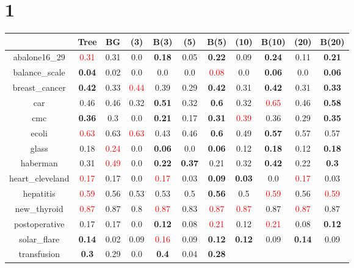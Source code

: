 \documentclass{article}%
\begin{document}
\section*{1}%
\begin{tabular}{c|cccccccccc}%
\hline%
&Tree&BG&(3)&B(3)&(5)&B(5)&(10)&B(10)&(20)&B(20)\\%
\hline%
abalone16\_29&\textcolor{red}{ 
0.31
}&0.31&0.0&\textbf{0.18}&0.05&\textbf{0.22}&0.09&\textbf{0.24}&0.11&\textbf{0.21}\\%
\hline%
balance\_scale&\textbf{0.04}&0.02&0.0&0.0&0.0&\textcolor{red}{ 
0.08
}&0.0&\textbf{0.06}&0.0&\textbf{0.06}\\%
\hline%
breast\_cancer&\textbf{0.42}&0.33&\textcolor{red}{ 
0.44
}&0.39&0.29&\textbf{0.42}&0.31&\textbf{0.42}&0.31&\textbf{0.33}\\%
\hline%
car&0.46&0.46&0.32&\textbf{0.51}&0.32&\textbf{0.6}&0.32&\textcolor{red}{ 
0.65
}&0.46&\textbf{0.58}\\%
\hline%
cmc&\textbf{0.36}&0.3&0.0&\textbf{0.21}&0.17&\textbf{0.31}&\textcolor{red}{ 
0.39
}&0.36&0.29&\textbf{0.35}\\%
\hline%
ecoli&\textcolor{red}{ 
0.63
}&0.63&\textcolor{red}{ 
0.63
}&0.43&0.46&\textbf{0.6}&0.49&\textbf{0.57}&0.57&0.57\\%
\hline%
glass&0.18&\textcolor{red}{ 
0.24
}&0.0&\textbf{0.06}&0.0&\textbf{0.06}&0.12&\textbf{0.18}&0.12&\textbf{0.18}\\%
\hline%
haberman&0.31&\textcolor{red}{ 
0.49
}&0.0&\textbf{0.22}&\textbf{0.37}&0.21&0.32&\textbf{0.42}&0.22&\textbf{0.3}\\%
\hline%
heart\_cleveland&\textcolor{red}{ 
0.17
}&0.17&0.0&\textcolor{red}{ 
0.17
}&0.03&\textbf{0.09}&\textbf{0.03}&0.0&\textcolor{red}{ 
0.17
}&0.03\\%
\hline%
hepatitis&\textcolor{red}{ 
0.59
}&0.56&0.53&0.53&0.5&\textbf{0.56}&0.5&\textcolor{red}{ 
0.59
}&0.56&\textcolor{red}{ 
0.59
}\\%
\hline%
new\_thyroid&\textcolor{red}{ 
0.87
}&0.87&0.8&\textcolor{red}{ 
0.87
}&0.83&\textcolor{red}{ 
0.87
}&\textcolor{red}{ 
0.87
}&0.87&\textcolor{red}{ 
0.87
}&0.87\\%
\hline%
postoperative&0.17&0.17&0.0&\textbf{0.12}&0.08&\textcolor{red}{ 
0.21
}&0.12&\textcolor{red}{ 
0.21
}&0.08&\textbf{0.12}\\%
\hline%
solar\_flare&\textbf{0.14}&0.02&0.09&\textcolor{red}{ 
0.16
}&0.09&\textbf{0.12}&\textbf{0.12}&0.09&\textbf{0.14}&0.09\\%
\hline%
transfusion&\textbf{0.3}&0.29&0.0&\textbf{0.4}&0.04&\textbf{0.28}&\textcolor{red}{ 
}
\end{tabular}
\end{document}
